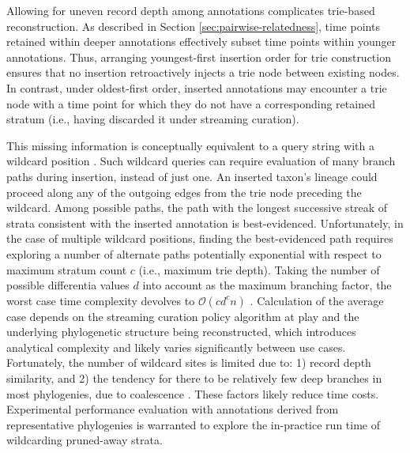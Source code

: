 Allowing for uneven record depth among annotations complicates trie-based reconstruction.
As described in Section \ref{sec:pairwise-relatedness}, time points retained within deeper annotations effectively subset time points within younger annotations.
Thus, arranging youngest-first insertion order for trie construction ensures that no insertion retroactively injects a trie node between existing nodes.
In contrast, under oldest-first order, inserted annotations may encounter a trie node with a time point for which they do not have a corresponding retained stratum (i.e., having discarded it under streaming curation).

This missing information is conceptually equivalent to a query string with a wildcard position \citep{fukuyama2016partial}.
Such wildcard queries can require evaluation of many branch paths during insertion, instead of just one.
An inserted taxon's lineage could proceed along any of the outgoing edges from the trie node preceding the wildcard.
Among possible paths, the path with the longest successive streak of strata consistent with the inserted annotation is best-evidenced.
Unfortunately, in the case of multiple wildcard positions, finding the best-evidenced path requires exploring a number of alternate paths potentially exponential with respect to maximum stratum count $c$ (i.e., maximum trie depth).
Taking the number of possible differentia values $d$ into account as the maximum branching factor, the worst case time complexity devolves to $\mathcal{O}(c d^c n)$ \citep{fukuyama2016partial}.
Calculation of the average case depends on the streaming curation policy algorithm at play and the underlying phylogenetic structure being reconstructed, which introduces analytical complexity and likely varies significantly between use cases.
Fortunately, the number of wildcard sites is limited due to: 1) record depth similarity, and 2) the tendency for there to be relatively few deep branches in most phylogenies, due to coalescence \citep{nordborgCoalescentTheory2019, berestyckiRecentProgressCoalescent2009}.
These factors likely reduce time costs.
Experimental performance evaluation with annotations derived from representative phylogenies is warranted to explore the in-practice run time of wildcarding pruned-away strata.



